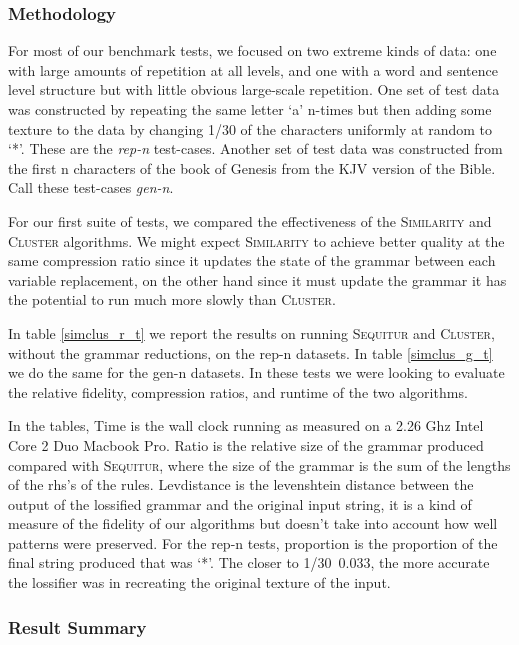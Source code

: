 \documentclass[11pt]{article}
\newcommand{\Sequitur}{\textsc{Sequitur}\xspace}
\newcommand{\Similarity}{\textsc{Similarity}\xspace}
\newcommand{\Cluster}{\textsc{Cluster}\xspace}
\begin{document}
\subsubsection{Methodology}

For most of our benchmark tests, we focused on two extreme kinds of data: one
with large amounts of repetition at all levels, and one with a word and
sentence level structure but with little obvious large-scale repetition.  One
set of test data was constructed by repeating the same letter `a' n-times but
then adding some texture to the data by changing 1/30 of the characters
uniformly at random to `*'. These are the \emph{rep-n} test-cases.
Another set of
test data was constructed from the first n characters of the book of Genesis
from the KJV version of the Bible. Call these test-cases \emph{gen-n}.

For our first suite of tests, we compared the effectiveness of the
\Similarity and \Cluster algorithms. We might expect \Similarity to
achieve better quality at the same compression ratio since it updates the state
of the grammar between each variable replacement, on the other hand since it
must update the grammar it has the potential to run much more slowly than
\Cluster. 

In table \ref{simclus_r_t} we report the results on running \Sequitur and
\Cluster, without the grammar reductions, on the rep-n datasets. In table
\ref{simclus_g_t} we do the same for the gen-n datasets.
In these tests
we were looking to evaluate the relative fidelity, compression ratios, and runtime 
of the two algorithms.

In the tables, Time is the
wall clock running as measured on a 2.26 Ghz Intel Core 2 Duo Macbook Pro.
Ratio is the relative size of the grammar produced compared with \Sequitur,
where the size of the grammar is the sum of the lengths of the rhs's of the
rules. Levdistance is the levenshtein distance between the output of the
lossified grammar and the original input string, it is a kind of measure of the
fidelity of our algorithms but doesn't take into account how well patterns were
preserved. For the rep-n tests, proportion is the proportion of the final
string produced that was `*'. The closer to 1/30~0.033, the more accurate the
lossifier was in recreating the original texture of the input.

\subsubsection{Result Summary}
\end{document}
